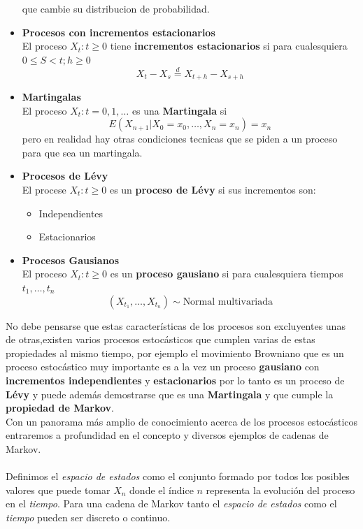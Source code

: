 \documentclass[10pt,a4paper]{article}
\theoremstyle{definition}
\theoremstyle{remark}
\begin{document}
\begin{multicols}{2}
\begin{itemize}
	que cambie su distribucion de probabilidad.\\
	\item \textbf{Procesos con incrementos estacionarios}\\
	El proceso ${X_t : t \geq 0}$ tiene \textbf{incrementos estacionarios} si para 
	cualesquiera $0\leq S < t; h \geq 0 $ $$X_t - X_s \stackrel{d}{=} X_{t+h} - X_{s+h} 
	$$
	\item \textbf{Martingalas} \\
	El proceso ${X_t : t = 0,1,\dots}$ es una \textbf{Martingala} si $$E(X_{n+1}|
	X_0=x_0,\dots,X_n=x_n)=x_n$$ pero en realidad hay otras condiciones tecnicas que se 
	piden a un proceso para que sea un martingala.\\
	\item \textbf{Procesos de Lévy} \\
	El procese ${X_t: t\geq0}$ es un \textbf{proceso de Lévy} si sus incrementos son:
	\begin{itemize}
		\item Independientes
		\item Estacionarios
	\end{itemize}
	\item \textbf{Procesos Gausianos}\\
	El proceso $X_t: t\geq 0$ es un \textbf{proceso gausiano} si para cualesquiera 
	tiempos $t_1,\dots,t_n$ 
	$$(X_{t_1},\dots,X_{t_n}) \sim \mbox{Normal multivariada}$$
\end{itemize}
\noindent No debe pensarse que estas características de los procesos son 
excluyentes unas de otras,existen varios procesos estocásticos que cumplen 
varias de estas propiedades al mismo tiempo, por ejemplo el movimiento Browniano que es un proceso estocástico muy importante es a la vez un proceso \textbf{gausiano} con \textbf{incrementos 
independientes} y \textbf{estacionarios} por lo tanto es un proceso de \textbf{Lévy} y 
puede además demostrarse que es una \textbf{Martingala} y que cumple la 
\textbf{propiedad de Markov}.\\

\noindent Con un panorama más amplio de conocimiento acerca de los procesos estocásticos entraremos a profundidad en el concepto y diversos ejemplos de cadenas de Markov.\\

\\
Definimos el \textit{espacio de estados} como el conjunto formado por todos los posibles 
valores que puede tomar $X_{n}$ donde el índice $n$ representa la evolución del proceso 
en el \textit{tiempo}. Para una cadena de Markov tanto el \textit{espacio de estados} 
como el \textit{tiempo} pueden ser discreto o continuo.\\


\end{multicols}
\end{document}

